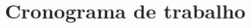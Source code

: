 \documentclass[12pt]{extarticle}
\begin{document}


\section{Cronograma de trabalho}




\end{document}
